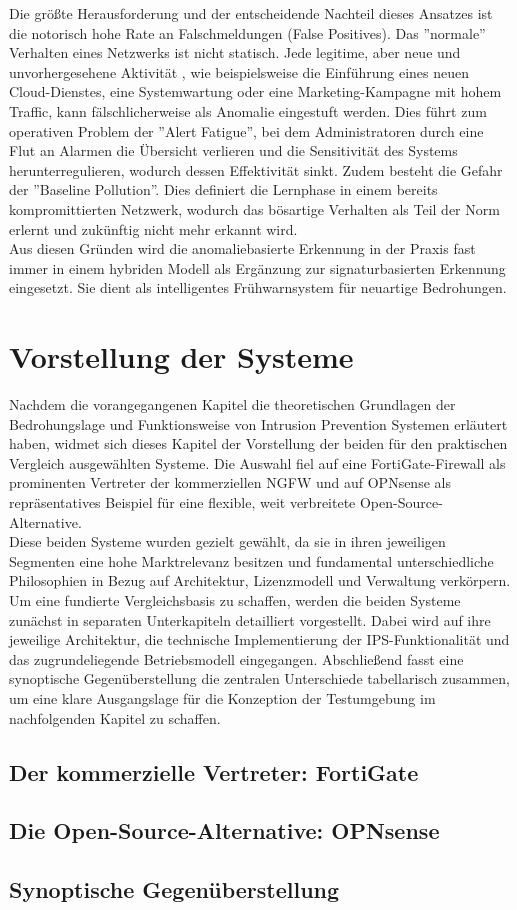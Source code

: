 Die größte Herausforderung und der entscheidende Nachteil dieses Ansatzes ist die notorisch hohe Rate an Falschmeldungen (False Positives). Das ''normale'' Verhalten eines Netzwerks ist nicht statisch. Jede legitime, aber neue und unvorhergesehene Aktivität , wie beispielsweise die Einführung eines neuen Cloud-Dienstes, eine Systemwartung oder eine Marketing-Kampagne mit hohem Traffic, kann fälschlicherweise als Anomalie eingestuft werden. Dies führt zum operativen Problem der ''Alert Fatigue'', bei dem Administratoren durch eine Flut an Alarmen die Übersicht verlieren und die Sensitivität des Systems herunterregulieren, wodurch dessen Effektivität sinkt. Zudem besteht die Gefahr der ''Baseline Pollution''. Dies definiert die Lernphase in einem bereits kompromittierten Netzwerk, wodurch das bösartige Verhalten als Teil der Norm erlernt und zukünftig nicht mehr erkannt wird.\\

Aus diesen Gründen wird die anomaliebasierte Erkennung in der Praxis fast immer in einem hybriden Modell als Ergänzung zur signaturbasierten Erkennung eingesetzt. Sie dient als intelligentes Frühwarnsystem für neuartige Bedrohungen.
\section{Vorstellung der Systeme}
Nachdem die vorangegangenen Kapitel die theoretischen Grundlagen der Bedrohungslage und Funktionsweise von Intrusion Prevention Systemen erläutert haben, widmet sich dieses Kapitel der Vorstellung der beiden für den praktischen Vergleich ausgewählten Systeme. Die Auswahl fiel auf eine FortiGate-Firewall als prominenten Vertreter der kommerziellen NGFW und auf OPNsense als repräsentatives Beispiel für eine flexible, weit verbreitete Open-Source-Alternative.\\

Diese beiden Systeme wurden gezielt gewählt, da sie in ihren jeweiligen Segmenten eine hohe Marktrelevanz besitzen und fundamental unterschiedliche Philosophien in Bezug auf Architektur, Lizenzmodell und Verwaltung verkörpern. Um eine fundierte Vergleichsbasis zu schaffen, werden die beiden Systeme zunächst in separaten Unterkapiteln detailliert vorgestellt. Dabei wird auf ihre jeweilige Architektur, die technische Implementierung der IPS-Funktionalität und das zugrundeliegende Betriebsmodell eingegangen. Abschließend fasst eine synoptische Gegenüberstellung die zentralen Unterschiede tabellarisch zusammen, um eine klare Ausgangslage für die Konzeption der Testumgebung im nachfolgenden Kapitel zu schaffen.
\subsection{Der kommerzielle Vertreter: FortiGate}
\subsection{Die Open-Source-Alternative: OPNsense}
\subsection{Synoptische Gegenüberstellung}